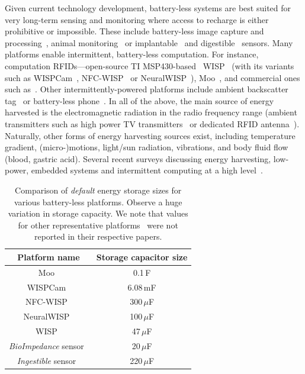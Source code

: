 Given current technology development, battery-less systems are best suited for
very long-term sensing and monitoring where access to recharge is either
prohibitive or impossible. These include battery-less image capture and
processing~\cite{naderiparizi_rfid_2015}, animal
monitoring~\cite{thomas_jbcs_2012} or implantable~\cite{rodriguez_tbcs_2015}
and digestible~\cite{nadeau_naturebio_2017} sensors.
% 
Many platforms enable intermittent, battery-less computation. For instance,
computation RFIDs---open-source TI MSP430-based~\cite{wolverine}
WISP~\cite{wisp5} (with its variants such as
WISPCam~\cite{naderiparizi_rfid_2015}, NFC-WISP~\cite{zhao_rfid_2015} or
NeuralWISP~\cite{holleman_biocas_2008}), Moo~\cite{moo}, and commercial ones
such as~\cite{medusa_farsens_2017}. Other intermittently-powered platforms
include ambient backscatter tag~\cite{liu_sigcomm_2013,parks_sigcomm_2014} or
battery-less phone~\cite{talla_imwut_2017}. In all of the above, the main
source of energy harvested is the electromagnetic radiation in the radio
frequency range (ambient transmitters such as high power TV
transmitters~\cite{liu_sigcomm_2013} or dedicated RFID
antenna~\cite{wisp5,moo,talla_imwut_2017,medusa_farsens_2017,holleman_biocas_2008,naderiparizi_rfid_2015}).
Naturally, other forms of energy harvesting sources exist, including
temperature gradient, (micro-)motions, light/sun radiation, vibrations, and
body fluid flow (blood, gastric acid).  Several recent surveys discussing
energy harvesting, low-power, embedded systems and intermittent computing at a
high
level~\cite{paradiso_pvc_2005,soyata_csm_2016,prasad_comst_2014,ku_cst_2016,lucia_snapl_2017}.

\begin{table}
	\centering
	\begin{tabular}{|c|c|}
	\hline
	Platform name & Storage capacitor size \\
	\hline \hline
	Moo~\cite{moo} & 0.1\,F \\
	WISPCam~\cite{naderiparizi_rfid_2015} & 6.08\,mF \\ %
	NFC-WISP~\cite{zhao_rfid_2015} & 300\,$\mu$F \\
	NeuralWISP~\cite{holleman_biocas_2008} & 100\,$\mu$F \\
	WISP~\cite{wisp5} & 47\,$\mu$F \\
	{\em BioImpedance} sensor~\cite{rodriguez_tbcs_2015} & 20\,$\mu$F \\
	{\em Ingestible} sensor~\cite{nadeau_naturebio_2017} & 220\,$\mu$F\\
	\hline
	\end{tabular} 
\caption{Comparison of {\em default} energy storage sizes for various battery-less platforms. Observe a huge variation in storage capacity. We note that values for other representative platforms~\cite{medusa_farsens_2017,talla_imwut_2017,liu_sigcomm_2013,parks_sigcomm_2014} were not reported in their respective papers.}
\label{table:capacitor}
\end{table}


